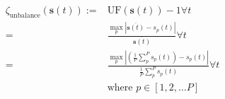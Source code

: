 \begin{equation}
	\begin{split}
		\zeta_\text{unbalance}(\textbf{s}(t)):=&\text{UF}(\textbf{s}(t)) - 1 \forall t\\
		=&\frac{\max_p\left|\overline{\textbf{s}(t)} - s_{p}(t)\right|}{\overline{\textbf{s}(t)}} \forall t\\
		=&\frac{\max_p\left|\left(\frac{1}{P}\sum_p^P{s_{p}(t)}\right) - s_{p}(t)\right|}{\frac{1}{P}\sum_p^P{s_{p}(t)}} \forall t\\
		&\text{where } p \in [1, 2, \dots P]
	\end{split}
	\label{ch1:equ:unbalance-cost}
\end{equation}
